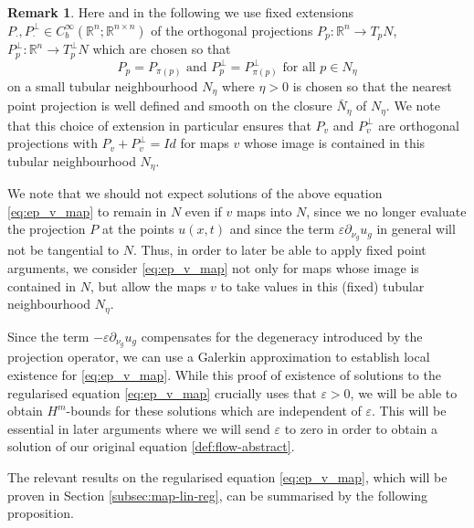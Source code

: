 \documentclass[10pt,reqno]{amsart}
\theoremstyle{plain}
\theoremstyle{definition}
\newtheorem{rmk}[lemma]{Remark}
\numberwithin{equation}{section}
\newcommand{\ep}{\varepsilon}
\newcommand{\R}{\ensuremath{{\mathbb R}}}
\newcommand{\beq}{\begin{equation}}
\newcommand{\eeq}{\end{equation}}
\newcommand{\eps}{\varepsilon}
\newcommand{\p}{\partial} %
\begin{document}
\begin{rmk}\label{rmk:extension-projection}
    Here and in the following we use fixed extensions $P_\cdot, P_\cdot^\perp \in C_b^\infty(\R^n;\R^{n\times n}) $ of the orthogonal projections $P_p:\R^n\to T_pN$, $P_p^\perp:\R^n\to T_p^\perp N$ which are chosen so that 
    \beq\label{def:ext-nbhd}
        P_p=P_{\pi(p)} \text{ and } P_p^\perp=P_{\pi(p)}^\perp \text{ for all } p\in N_\eta
    \eeq 
    on a small tubular neighbourhood $N_\eta$ where $\eta>0$ is chosen so that the nearest point projection is well defined and smooth on the closure $\bar N_\eta$ of $N_\eta$. We note that this choice of extension in particular ensures that $P_v$ and $P_v^\perp$ are orthogonal projections with $P_v+P_v^\perp=\textit{Id}$ for maps $v$ whose image is contained in this tubular neighbourhood $N_\eta$.
\end{rmk}

We note that we should not expect solutions of the above equation \eqref{eq:ep_v_map} to remain in $N$ even if $v$ maps into $N$, since we no longer evaluate the projection $P$ at the points $u(x,t)$ and since the term $\ep\p_{\nu_g} u_g$ in general will not be tangential to $N$. Thus, in order to later be able to apply fixed point arguments, we consider \eqref{eq:ep_v_map} not only for maps whose image is contained in $N$, but allow the maps $v$ to take values in this (fixed) tubular neighbourhood $N_{\eta}$. 


Since the term $-\ep\p_{\nu_{g}}u_{g}$ compensates for the degeneracy introduced by the projection operator, we can use a Galerkin approximation to establish local existence for \eqref{eq:ep_v_map}. While this proof of existence of solutions to the regularised equation \eqref{eq:ep_v_map} crucially uses that $\eps>0$, we will be able to obtain $H^m$-bounds for these solutions which are independent of $\eps$. This will be essential in later arguments where we will send $\eps$ to zero in order to obtain a solution of our original equation \eqref{def:flow-abstract}.

The relevant results on the regularised equation \eqref{eq:ep_v_map}, which will be proven in Section  \ref{subsec:map-lin-reg}, can be summarised by the following proposition. 
\end{document}

